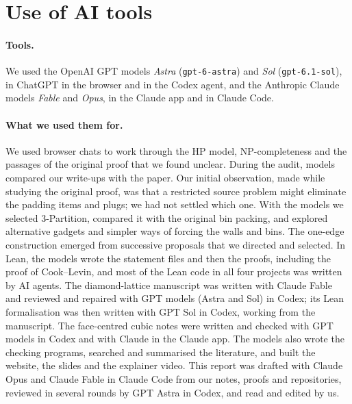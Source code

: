 \documentclass[11pt,letterpaper]{article}
\theoremstyle{definition}
\theoremstyle{remark}
\begin{document}
\section{Use of AI tools}\label{sec:ai}

\paragraph{Tools.}
We used the OpenAI GPT models \emph{Astra} (\texttt{gpt-6-astra}) and \emph{Sol}
(\texttt{gpt-6.1-sol}), in ChatGPT in the browser and in the Codex agent, and the Anthropic Claude
models \emph{Fable} and \emph{Opus}, in the Claude app and in Claude Code.

\paragraph{What we used them for.}
We used browser chats to work through the HP model, NP-completeness and the passages of the original
proof that we found unclear. During the audit, models compared our write-ups with the paper. Our initial observation, made while studying the original proof, was that a restricted
source problem might eliminate the padding items and plugs; we had not settled which one. With the
models we selected 3-Partition, compared it with the original bin packing, and explored alternative
gadgets and simpler ways of forcing the walls and bins. The one-edge construction emerged from
successive proposals that we directed and selected. In Lean, the models wrote the statement files
and then the proofs, including the proof of Cook--Levin, and most of the Lean code in all four
projects was written by AI agents. The diamond-lattice manuscript was written with
Claude Fable and reviewed and repaired with GPT models (Astra and Sol) in Codex; its Lean
formalisation was then written with GPT Sol in Codex, working from the manuscript. The
face-centred cubic notes were written and checked with GPT models in Codex and with Claude in the
Claude app. The models also wrote the
checking programs, searched and summarised the literature, and built the website, the slides and the
explainer video. This report was drafted with Claude Opus and Claude Fable in Claude Code from our
notes, proofs and repositories, reviewed in several rounds by GPT Astra in Codex, and read and
edited by us.
\end{document}

